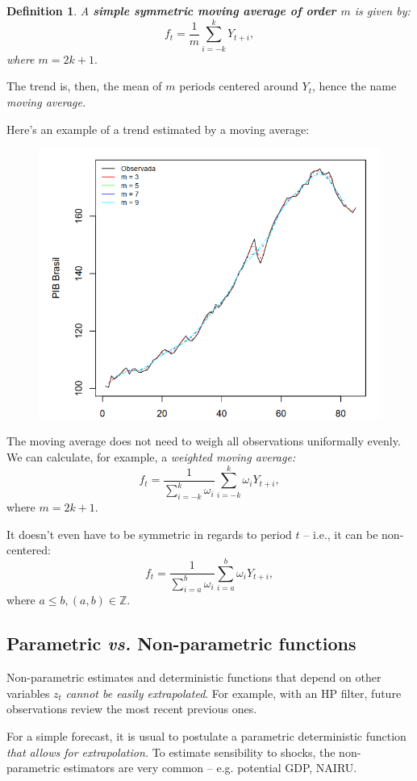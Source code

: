 \documentclass[11pt, a4paper]{report}
\theoremstyle{plain}
\theoremstyle{plain}
\newtheorem{defn}{Definition}[section]
\theoremstyle{remark}
\begin{document}
\begin{defn}
	A \textbf{simple symmetric moving average of order $m$} is given by:
	$$ f_t = \dfrac{1}{m} \sum_{i = -k}^{k} Y_{t+i},$$
	where $m = 2k + 1.$
\end{defn}

The trend is, then, the mean of $m$ periods centered around $Y_t$, hence the name \textit{moving average.}

Here's an example of a trend estimated by a moving average: 
\begin{figure}[h!]
	\centering
	\includegraphics[width=0.6\linewidth]{"moving average"}
	\label{fig:moving-average}
\end{figure}

The moving average does not need to weigh all observations uniformally evenly. We can calculate, for example, a \textit{weighted moving average:}
$$f_{t}=\frac{1}{\sum_{i=-k}^{k} \omega_{i}} \sum_{i=-k}^{k} \omega_{i} Y_{t+i},$$
where $m = 2k + 1$.

It doesn't even have to be symmetric in regards to period $t$ -- i.e., it can be non-centered:
$$f_{t}=\frac{1}{\sum_{i=a}^{b} \omega_{i}} \sum_{i=a}^{b} \omega_{i} Y_{t+i},$$
where $a \leq b, (a,b) \in \mathbb{Z}$.

\subsection{Parametric \textit{vs.} Non-parametric functions}

Non-parametric estimates and deterministic functions that depend on other variables $z_t$ \textit{cannot be easily extrapolated}. For example, with an HP filter, future observations review the most recent previous ones. 

For a simple forecast, it is usual to postulate a parametric deterministic function \textit{that allows for extrapolation.} To estimate sensibility to shocks, the non-parametric estimators are very common -- e.g. potential GDP, NAIRU.
\end{document}
